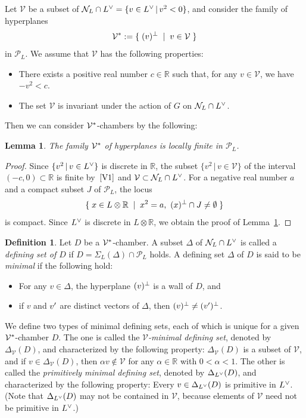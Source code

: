 \documentclass{amsart}
\theoremstyle{plain}
\newtheorem{lemma}[theorem]{Lemma}
\theoremstyle{definition}
\newtheorem{definition}[theorem]{Definition}
\theoremstyle{remark}
\numberwithin{equation}{section}
\numberwithin{table}{section}
\numberwithin{figure}{section}
\newcommand{\R}{\mathord{\mathbb R}}
\newcommand{\NNN}{\mathord{\mathcal N}}
\newcommand{\PPP}{\mathord{\mathcal P}}
\newcommand{\VVV}{\mathord{\mathcal V}}
\newcommand{\set}[2]{\{\; {#1} \; \mid \; {#2} \;  \}}
\newcommand{\shortset}[2]{\{ {#1} \,|\, {#2}   \}}
\newcommand{\tensor}{\otimes}
\newcommand{\sprime}{\sp\prime}
\newcommand{\sperp}{\sp{\perp}}
\newcommand{\dual}{\sp{\vee}}
\newcommand{\sphyp}{\sp*}
\newcommand{\propVone}{\mathord{\rm [V1]}}
\newcommand{\propVtwo}{\mathord{\rm [V2]}}
\begin{document}
%
Let $\VVV$  be a subset of  $\NNN_L\cap L\dual=\shortset{v\in L\dual}{v^2<0}$, and consider the family of hyperplanes
$$
\VVV\sphyp:=\set{(v)\sperp}{v\in \VVV}
$$
in $\PPP_L$.
We assume that  $\VVV$ has the following properties:
%
\begin{itemize}
\item[$\propVone$] There exists  a positive real number $c\in \R$ such that,  for any $v\in \VVV$, we have $-v^2<c$. 
\item[$\propVtwo$] The set  $\VVV$ is invariant under  the action of $G$ on $\NNN_L \cap L\dual$. 
\end{itemize}
% 
%
Then we can consider $\VVV\sphyp$-chambers by  the following:
%
\begin{lemma}\label{lem:locallyfinite}
The family $\VVV\sphyp$ of hyperplanes 
is  locally finite in $\PPP_L$.
\end{lemma}
%
\begin{proof}
Since  $\shortset{v^2}{v\in L\dual}$ is discrete in $\R$,
the subset $\shortset{v^2}{v\in \VVV}$ of the interval $(-c, 0)\subset \R$  is finite by~$\propVone$
and $\VVV\subset \NNN_L\cap L\dual$.
For a negative real number $a$ and a compact subset $J$ of $\PPP_L$,
the locus
$$
\set{x\in L\tensor \R}{x^2=a,  \,\, (x)\sperp\cap J\ne \emptyset}
$$
is compact.
Since  $L\dual$ is discrete in $L\tensor\R$, 
we obtain the proof of Lemma~\ref{lem:locallyfinite}.
\end{proof}
%
%
\begin{definition}
Let $D$ be  a $\VVV\sphyp$-chamber.
 A subset $\Delta$ of $\NNN_L\cap L\dual$ is called a \emph{defining set of $D$}
 if $D=\Sigma_{L}(\Delta)\cap \PPP_L$ holds.
 A defining set $\Delta$ of $D$ is said to be \emph{minimal} 
 if the following hold:
%
 \begin{itemize}
 \item For any $v\in \Delta$, the hyperplane $(v)\sperp$ is a wall of $D$, and 
 \item if $v$ and $v\sprime$ are distinct vectors of $\Delta$, then $(v)\sperp\ne (v\sprime)\sperp$.
 \end{itemize}
 We define two types of minimal defining sets,  each of which is unique 
 for a given $\VVV\sphyp$-chamber $D$.
 The one is called the \emph{$\VVV$-minimal defining set},
 denoted by $\Delta_{\VVV}(D)$, and characterized by the following property:
 $\Delta_{\VVV}(D)$ is a subset of $\VVV$, and  if $v\in \Delta_{\VVV}(D)$, then $\alpha v\notin \VVV$
 for any $\alpha\in \R$ with $0<\alpha<1$.
 The other is called the \emph{primitively minimal defining set},
 denoted by $\Delta_{L\dual}(D)$, and characterized by the following property:
 Every $v\in \Delta_{L\dual}(D)$ is primitive in $L\dual$.
 (Note that $\Delta_{L\dual}(D)$ may not be contained in $\VVV$, because elements of $\VVV$ need not be primitive in $L\dual$.)
 \end{definition}
\end{document}
